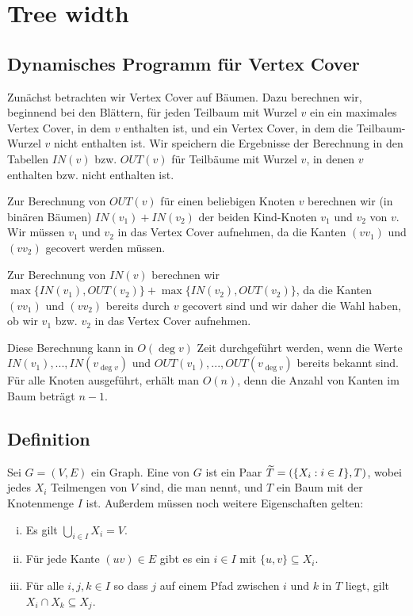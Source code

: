 \chapter{Tree width}

\section{Dynamisches Programm für Vertex Cover}
  
  Zunächst betrachten wir Vertex Cover auf Bäumen. Dazu berechnen wir, beginnend bei den Blättern, für jeden Teilbaum mit Wurzel \(v\) ein ein maximales Vertex Cover, in dem \(v\) enthalten ist, und ein Vertex Cover, in dem die Teilbaum-Wurzel \(v\) nicht enthalten ist. Wir speichern die Ergebnisse der Berechnung in den Tabellen \(IN(v)\) bzw. \(OUT(v)\) für Teilbäume mit Wurzel \(v\), in denen \(v\) enthalten bzw. nicht enthalten ist.

  Zur Berechnung von \(OUT(v)\) für einen beliebigen Knoten \(v\) berechnen wir (in binären Bäumen) \(IN(v_1) + IN(v_2)\) der beiden Kind-Knoten \(v_1\) und \(v_2\) von \(v\). Wir müssen \(v_1\) und \(v_2\) in das Vertex Cover aufnehmen, da die Kanten \((vv_1)\) und \((vv_2)\) gecovert werden müssen.

  Zur Berechnung von \(IN(v)\) berechnen wir \(\max \{ IN(v_1), OUT(v_2) \} + \max \{ IN(v_2), OUT(v_2) \}\), da die Kanten \((vv_1)\) und \((vv_2)\) bereits durch \(v\) gecovert sind und wir daher die Wahl haben, ob wir \(v_1\) bzw. \(v_2\) in das Vertex Cover aufnehmen.

  Diese Berechnung kann in \(O(\deg v)\) Zeit durchgeführt werden, wenn die Werte \(IN(v_1), ..., IN(v_{\deg v})\) und \(OUT(v_1), ..., OUT(v_{\deg v})\) bereits bekannt sind. Für alle Knoten ausgeführt, erhält man \(O(n)\), denn die Anzahl von Kanten im Baum beträgt \(n-1\).

\section{Definition}
  
  Sei \(G = (V,E)\) ein Graph. Eine  von \(G\) ist ein Paar \(\widetilde{T} = ( \{ X_i : i \in I \}, T )\), wobei jedes \(X_i\) Teilmengen von \(V\) sind, die man  nennt, und \(T\) ein Baum mit der Knotenmenge \(I\) ist. Außerdem müssen noch weitere Eigenschaften gelten:
  \begin{enumerate}[(i)]
   \item Es gilt \(\bigcup_{i \in I} X_i = V\).
   \item Für jede Kante \((uv) \in E\) gibt es ein \(i \in I\) mit \(\{u,v\} \subseteq X_i\).
   \item Für alle \(i,j,k \in I\) so dass \(j\) auf einem Pfad zwischen \(i\) und \(k\) in \(T\) liegt, gilt \(X_i \cap X_k \subseteq X_j\).
  \end{enumerate}
  
